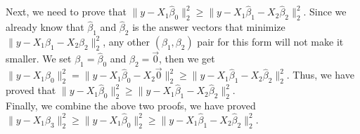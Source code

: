 \documentclass[11pt]{article}
\begin{document}
\noindent
Next, we need to prove that $\|y-X_1\hat{\beta}_0\|_2^2 \geq \|y-X_1\hat{\beta}_1-X_2\hat{\beta}_2\|_2^2$. Since we already know that $\hat{\beta}_1$ and $\hat{\beta}_2$ is the answer vectors that minimize $ \|y-X_1\beta_1-X_2\beta_2\|_2^2$, any other $(\beta_1, \beta_2)$ pair for this form will not make it smaller. We set $\beta_1 = \hat{\beta}_0$ and $\beta_2 = \vec{0}$, then we get $\|y-X_1\hat{\beta}_0\|_2^2 = \|y-X_1\hat{\beta}_0 - X_2\vec{0}  \|_2^2 \geq \|y-X_1\hat{\beta}_1-X_2\hat{\beta}_2\|_2^2$. Thus, we have proved that $\|y-X_1\hat{\beta}_0\|_2^2 \geq \|y-X_1\hat{\beta}_1-X_2\hat{\beta}_2\|_2^2$.\\

\noindent
Finally, we combine the above two proofs, we have proved $\|y-X_1\hat{\beta}_3\|_2^2 \geq \|y-X_1\hat{\beta}_0\|_2^2 \geq \|y-X_1\hat{\beta}_1-X_2\hat{\beta}_2\|_2^2
$.\\
\end{document}
